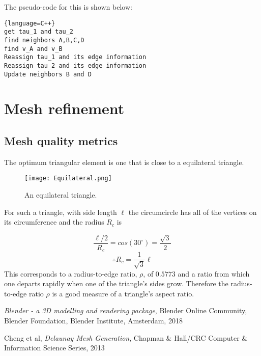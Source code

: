 \documentclass[11pt,letterpaper,titlepage]{article}
\begin{document}
\newpage
\noindent The pseudo-code for this is shown below:
\begin{lstlisting}{language=C++}
get tau_1 and tau_2
find neighbors A,B,C,D
find v_A and v_B
Reassign tau_1 and its edge information
Reassign tau_2 and its edge information
Update neighbors B and D
\end{lstlisting}


\newpage
{}
\section{Mesh refinement}

\subsection{Mesh quality metrics}
The optimum triangular element is one that is close to a equilateral triangle.

\begin{figure}[h]
\centering
\texttt{[image: Equilateral.png]}
\caption{An equilateral triangle.}
\label{fig:Equilateral}
\end{figure}

\noindent
For such a triangle, with side length $\ell$ the circumcircle has all of the vertices on its circumference and the radius $R_c$ is

$$\frac{\ell/2}{R_c} = cos(30^\circ)=\frac{\sqrt{3}}{2}$$
$$\therefore R_c = \frac{1}{\sqrt{3}}\ell$$
\newline
This corresponds to a radius-to-edge ratio, $\rho$, of $0.5773$ and a ratio from which one departs rapidly when one of the triangle's sides grow. Therefore the radius-to-edge ratio $\rho$ is a good measure of a triangle's aspect ratio.



\newpage
{}
\begin{thebibliography}{1}

	 {\em Blender - a 3D modelling and rendering package}, Blender Online Community, Blender Foundation, Blender Institute, Amsterdam, 2018
	
	 Cheng et al, {\em Delaunay Mesh Generation}, Chapman \& Hall/CRC Computer \& Information Science Series, 2013
	
	
\end{thebibliography}
\end{document}

